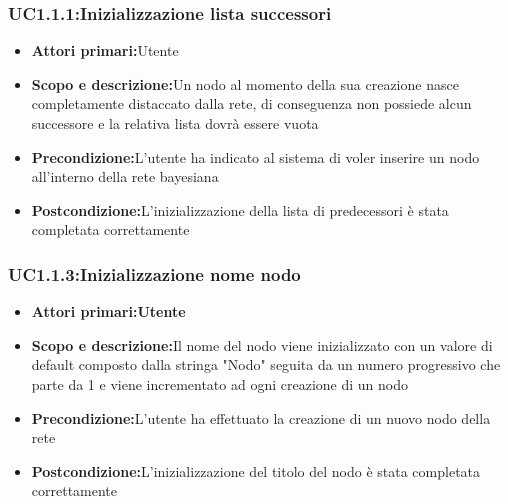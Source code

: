 \subsubsection{UC1.1.1:Inizializzazione lista successori}
\begin{itemize}
	\item{\textbf{Attori primari:}Utente}
	\item{\textbf{Scopo e descrizione:}Un nodo al momento della sua creazione nasce completamente distaccato dalla rete, di conseguenza non possiede alcun successore e la relativa lista dovrà essere vuota}
	\item{\textbf{Precondizione:}L'utente ha indicato al sistema di voler inserire un nodo all'interno della rete bayesiana}
	\item{\textbf{Postcondizione:}L'inizializzazione della lista di predecessori è stata completata correttamente}
\end{itemize}
\subsubsection{UC1.1.3:Inizializzazione nome nodo}
\begin{itemize}
	\item{\textbf{Attori primari:Utente}}
	\item{\textbf{Scopo e descrizione:}Il nome del nodo viene inizializzato con un valore di default composto dalla stringa "Nodo" seguita da un numero progressivo che parte da 1 e viene incrementato ad ogni creazione di un nodo}
	\item{\textbf{Precondizione:}L'utente ha effettuato la creazione di un nuovo nodo della rete}
	\item{\textbf{Postcondizione:}L'inizializzazione del titolo del nodo è stata completata correttamente}
\end{itemize}

